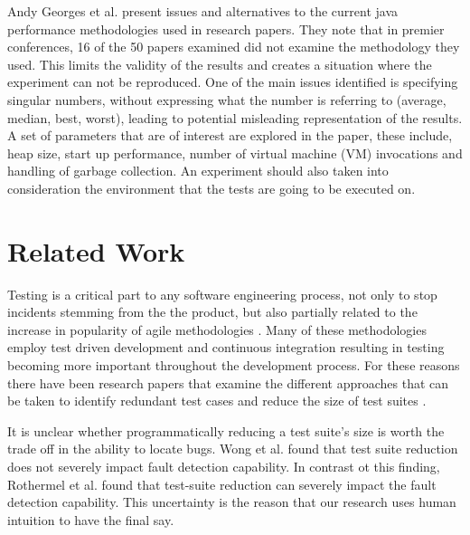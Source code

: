 Andy Georges et al. \cite{CiteTODO}  present issues and alternatives to the current java performance methodologies used in research papers. They note that in premier conferences, 16 of the 50 papers examined did not examine the methodology they used. This limits the validity of the results and creates a situation where the experiment can not be reproduced. One of the main issues identified is specifying singular numbers, without expressing what the number is referring to (average, median, best, worst), leading to potential misleading representation of the results. A set of parameters that are of interest are explored in the paper, these include, heap size, start up performance, number of virtual machine (VM) invocations and handling of garbage collection.  An experiment should also taken into consideration the environment that the tests are going to be executed on.


\section{Related Work}
\label{relatedworkRef}
Testing is a critical part to any software engineering process, not only to stop incidents stemming from the the product, but also partially related to the increase in popularity of agile methodologies \cite{chaos}. Many of these methodologies employ test driven development and continuous integration resulting in testing becoming more important throughout the development process. For these reasons there have been research papers that examine the different approaches that can be taken to identify redundant test cases and reduce the size of test suites \cite{wong1995effect, wong1999test, rothermel1998empirical, rothermel2002empirical,koochakzadeh2009test,zhang2011empirical,li2008static}.

It is unclear whether programmatically reducing a test suite's size is worth the trade off in the ability to locate bugs.  Wong et al. \cite{wong1995effect, wong1999test} found that test suite reduction does not severely impact fault detection capability. In contrast ot this finding, Rothermel et al. \cite{rothermel1998empirical, rothermel2002empirical} found that test-suite reduction can severely impact the fault detection capability. This uncertainty is the reason that our research uses human intuition to have the final say.

